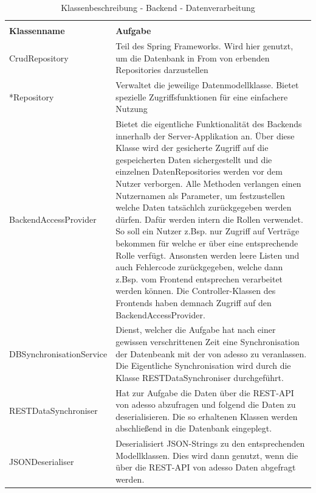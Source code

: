 \centering
\begin{longtable}[h]{p{5cm} p{9cm}}
	\caption{Klassenbeschreibung - Backend - Datenverarbeitung}
	\label{table:klassenbeschreibung-backend-data}
	\endlastfoot
	\multicolumn{2}{r}{{Weitergeführt auf der folgenden Seite}} \\
	\endfoot
	\endhead
	\rowcolor[HTML]{C0C0C0} 
	\textbf{Klassenname} & \textbf{Aufgabe} \\
	CrudRepository & Teil des Spring Frameworks. Wird hier genutzt, um die Datenbank in From von erbenden Repositories darzustellen \\
	\rowcolor[HTML]{E7E7E7} 
	*Repository & Verwaltet die jeweilige Datenmodellklasse. Bietet spezielle Zugriffsfunktionen für eine einfachere Nutzung \\
	BackendAccessProvider & Bietet die eigentliche Funktionalität des Backends innerhalb der Server-Applikation an. Über diese Klasse wird der gesicherte Zugriff auf die gespeicherten Daten sichergestellt und die 
    einzelnen DatenRepositories werden vor dem Nutzer verborgen. Alle Methoden verlangen einen Nutzernamen als Parameter, um festzustellen welche Daten tatsächlch zurückgegeben werden dürfen. Dafür werden intern die Rollen verwendet.
    So soll ein Nutzer z.Bsp. nur Zugriff auf Verträge bekommen für welche er über eine entsprechende Rolle verfügt. Ansonsten werden leere Listen und auch Fehlercode zurückgegeben, welche dann z.Bsp. vom Frontend
    entsprechen verarbeitet werden können. Die Controller-Klassen des Frontends haben demnach Zugriff auf den BackendAccessProvider. \\
	\rowcolor[HTML]{E7E7E7} 
	DBSynchronisationService & Dienst, welcher die Aufgabe hat nach einer gewissen verschrittenen Zeit eine Synchronisation der Datenbeank mit der von adesso zu veranlassen. Die Eigentliche Synchronisation wird
    durch die Klasse RESTDataSynchroniser durchgeführt. \\
    RESTDataSynchroniser & Hat zur Aufgabe die Daten über die REST-API von adesso abzufragen und folgend die Daten zu deserialisieren. Die so erhaltenen Klassen werden abschließend in die Datenbank eingeplegt. \\
	\rowcolor[HTML]{E7E7E7} 
    JSONDeserialiser & Deserialisiert JSON-Strings zu den entsprechenden Modellklassen. Dies wird dann genutzt, wenn die über die REST-API von adesso Daten abgefragt werden. \\
\end{longtable}